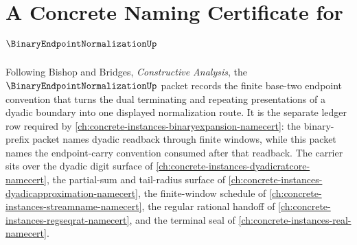 \chapter{A Concrete Naming Certificate for $\BinaryEndpointNormalizationUp$}
\label{ch:concrete-instances-binary-endpoint-normalization-namecert}

Following Bishop and Bridges, \emph{Constructive Analysis}, the $\BinaryEndpointNormalizationUp$ packet records the finite base-two endpoint convention that turns the dual terminating and repeating presentations of a dyadic boundary into one displayed normalization route. It is the separate ledger row required by \autoref{ch:concrete-instances-binaryexpansion-namecert}: the binary-prefix packet names dyadic readback through finite windows, while this packet names the endpoint-carry convention consumed after that readback. The carrier sits over the dyadic digit surface of \autoref{ch:concrete-instances-dyadicratcore-namecert}, the partial-sum and tail-radius surface of \autoref{ch:concrete-instances-dyadicapproximation-namecert}, the finite-window schedule of \autoref{ch:concrete-instances-streamname-namecert}, the regular rational handoff of \autoref{ch:concrete-instances-regseqrat-namecert}, and the terminal seal of \autoref{ch:concrete-instances-real-namecert}.

